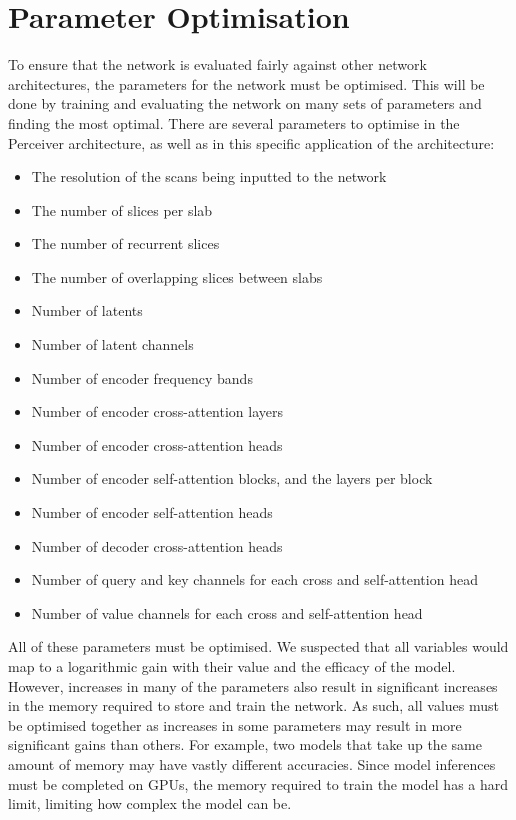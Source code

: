 \documentclass{l4proj}
\begin{document}
\section{Parameter Optimisation} \label{sec:parameters}

To ensure that the network is evaluated fairly against other network architectures, the parameters for the network must be optimised. This will be done by training and evaluating the network on many sets of parameters and finding the most optimal. There are several parameters to optimise in the Perceiver architecture, as well as in this specific application of the architecture:

\begin{itemize}
  \item{The resolution of the scans being inputted to the network}
  \item{The number of slices per slab}
  \item{The number of recurrent slices}
  \item{The number of overlapping slices between slabs}
  \item{Number of latents}
  \item{Number of latent channels}
  \item{Number of encoder frequency bands}
  \item{Number of encoder cross-attention layers}
  \item{Number of encoder cross-attention heads}
  \item{Number of encoder self-attention blocks, and the layers per block}
  \item{Number of encoder self-attention heads}
  \item{Number of decoder cross-attention heads}
  \item{Number of query and key channels for each cross and self-attention head}
  \item{Number of value channels for each cross and self-attention head}
\end{itemize}

All of these parameters must be optimised. We suspected that all variables would map to a logarithmic gain with their value and the efficacy of the model. However, increases in many of the parameters also result in significant increases in the memory required to store and train the network. As such, all values must be optimised together as increases in some parameters may result in more significant gains than others. For example, two models that take up the same amount of memory may have vastly different accuracies. Since model inferences must be completed on GPUs, the memory required to train the model has a hard limit, limiting how complex the model can be.
\end{document}
